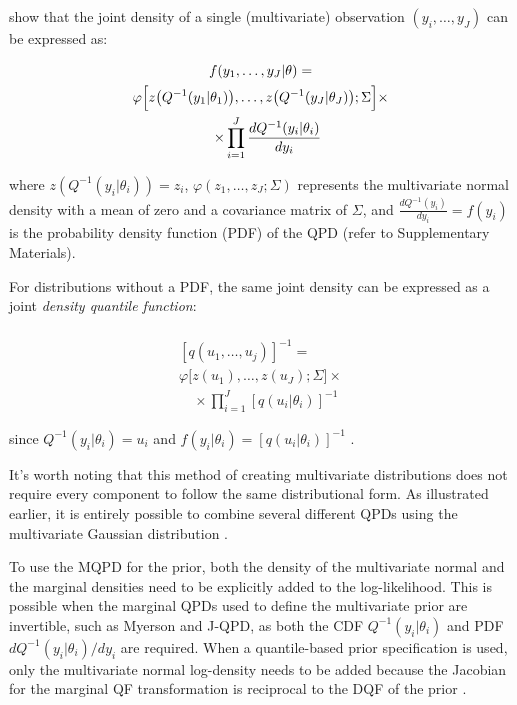 \documentclass[
  fleqn,
  deca,
  blindrev
]{informs4}
\begin{document}
\citet{drovandi2011LikelihoodfreeBayesianEstimation} show that the joint
density of a single (multivariate) observation \((y_i,\dots,y_J)\) can
be expressed as:

\[
\begin{gathered}
f(y_1,\dots,y_J\vert\theta)=\\
\varphi\Bigl[z\bigl(Q^{-1}(y_1\vert\theta_1)\bigr),\dots,z\bigl(Q^{-1}(y_J\vert\theta_J)\bigr);\Sigma\Bigr]\times\\
\quad \times\prod_{i=1}^{J}\frac{dQ^{-1}(y_i\vert\theta_i)}{dy_i}
\end{gathered}
\]

where \(z(Q^{-1}(y_i\vert\theta_i))=z_i\),
\(\varphi(z_1,\dots,z_J;\Sigma)\) represents the multivariate normal
density with a mean of zero and a covariance matrix of \(\Sigma\), and
\(\frac{dQ^{-1}(y_i)}{dy_i}=f(y_i)\) is the probability density function
(PDF) of the QPD (refer to Supplementary Materials).

For distributions without a PDF, the same joint density can be expressed
as a joint \emph{density quantile function}:

\[
\begin{gathered}
\\
[q(u_1,\dots,u_j)]^{-1}=\\
\varphi\bigl[z(u_1),\dots,z(u_J);\Sigma\bigr]\times\\
\quad \times \prod_{i=1}^{J}[q(u_i\vert\theta_i)]^{-1}
\end{gathered}
\]

since \(Q^{-1}(y_i\vert\theta_i)=u_i\) and
\(f(y_i\vert\theta_i)=[q(u_i\vert\theta_i)]^{-1}\)
\citep{gilchrist2000StatisticalModellingQuantile}.

It's worth noting that this method of creating multivariate
distributions does not require every component to follow the same
distributional form. As illustrated earlier, it is entirely possible to
combine several different QPDs using the multivariate Gaussian
distribution \citep{drovandi2011LikelihoodfreeBayesianEstimation}.

To use the MQPD for the prior, both the density of the multivariate
normal and the marginal densities need to be explicitly added to the
log-likelihood. This is possible when the marginal QPDs used to define
the multivariate prior are invertible, such as Myerson and J-QPD, as
both the CDF \(Q^{-1}(y_i\vert\theta_i)\) and PDF
\(dQ^{-1}(y_i\vert\theta_i)/dy_i\) are required. When a quantile-based
prior specification is used, only the multivariate normal log-density
needs to be added because the Jacobian for the marginal QF
transformation is reciprocal to the DQF of the prior
\citep{perepolkin2023TenetsQuantilebasedInference}.
\end{document}
